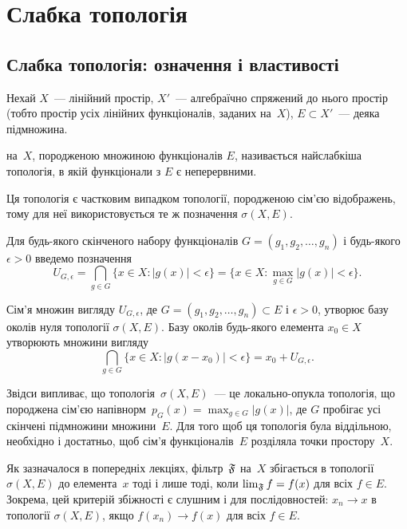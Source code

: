 \chapter{Слабка топологія}

\section{Слабка топологія: означення і властивості}

\begin{definition}
    Нехай $X$~--- лінійний простір, $X'$~--- алгебраїчно спряжений до нього простір (тобто простір усіх лінійних функціоналів, заданих на~$X$), $E \subset X'$~--- деяка підмножина. 
    
     на~$X$, породженою множиною функціоналів $E$, називається найслабкіша топологія, в якій функціонали з $E$ є неперервними.
\end{definition}

\begin{remark}
    Ця топологія є частковим випадком топології, породженою сім'єю відображень, тому для неї використовується те ж позначення $\sigma(X, E)$.
\end{remark}

Для будь-якого скінченого набору функціоналів $G = (g_1, g_2, \dots, g_n)$ і будь-якого $\epsilon > 0$ введемо позначення
\begin{equation*}
    U_{G, \epsilon} = \bigcap_{g \in G} \{x \in X: |g(x)| < \epsilon\} = \{x \in X: \max_{g \in G} |g(x)| < \epsilon\}.
\end{equation*}

Сім'я множин вигляду $U_{G,\epsilon}$, де $G = (g_1, g_2, \dots, g_n) \subset E$ і $\epsilon > 0$, утворює базу околів нуля топології $\sigma(X, E)$. Базу околів будь-якого елемента $x_0 \in X$ утворюють множини вигляду 
\begin{equation*}
    \bigcap_{g \in G} \{x \in X: |g(x - x_0)| < \epsilon\} = x_0 + U_{G, \epsilon}.
\end{equation*}

Звідси випливає, що топологія~$\sigma(X, E)$~--- це локально-опукла топологія, що породжена сім'єю напівнорм~$p_G(x) = \max_{g \in G} |g(x)|$, де $G$ пробігає усі скінчені підмножини множини~$E$. Для того щоб ця топологія була віддільною, необхідно і достатньо, щоб сім'я функціоналів~$E$ розділяла точки простору~$X$.

Як зазначалося в попередніх лекціях, фільтр~$\frak F$ на~$X$ збігається в топології~$\sigma(X, E)$ до елемента~$x$ тоді і лише тоді, коли $\lim_{\frak F} f = f(x)$ для всіх $f \in E$. Зокрема, цей критерій збіжності є слушним і для послідовностей: $x_n \to x$ в топології $\sigma(X, E)$, якщо $f(x_n) \to f(x)$ для всіх $f \in E$.

